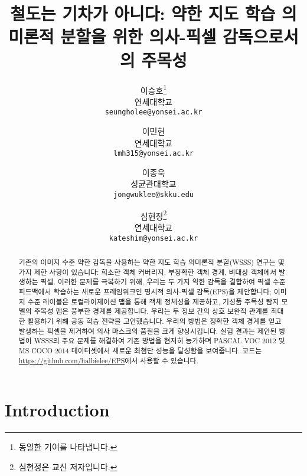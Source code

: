 \documentclass[final]{cvpr}
\begin{document}
\title{철도는 기차가 아니다: 약한 지도 학습 의미론적 분할을 위한 의사-픽셀 감독으로서의 주목성}

\author{이승호\thanks{동일한 기여를 나타냅니다.}\\
연세대학교\\
{\tt\small seungholee@yonsei.ac.kr}
\and
이민현\footnotemark[1]\\
연세대학교\\
{\tt\small lmh315@yonsei.ac.kr}
\and 
이종욱\\
성균관대학교\\
{\tt\small jongwuklee@skku.edu}
\and 
심현정\thanks{심현정은 교신 저자입니다.}\\
연세대학교\\
{\tt\small kateshim@yonsei.ac.kr}
}

\maketitle
\thispagestyle{empty}
\pagestyle{empty}


\begin{abstract}
기존의 이미지 수준 약한 감독을 사용하는 약한 지도 학습 의미론적 분할(WSSS) 연구는 몇 가지 제한 사항이 있습니다: 희소한 객체 커버리지, 부정확한 객체 경계, 비대상 객체에서 발생하는 픽셀. 이러한 문제를 극복하기 위해, 우리는 두 가지 약한 감독을 결합하여 픽셀 수준 피드백에서 학습하는 새로운 프레임워크인 명시적 의사-픽셀 감독(EPS)을 제안합니다; 이미지 수준 레이블은 로컬라이제이션 맵을 통해 객체 정체성을 제공하고, 기성품 주목성 탐지 모델의 주목성 맵은 풍부한 경계를 제공합니다. 우리는 두 정보 간의 상호 보완적 관계를 최대한 활용하기 위해 공동 학습 전략을 고안했습니다. 우리의 방법은 정확한 객체 경계를 얻고 발생하는 픽셀을 제거하여 의사 마스크의 품질을 크게 향상시킵니다. 실험 결과는 제안된 방법이 WSSS의 주요 문제를 해결하여 기존 방법을 현저히 능가하며 PASCAL VOC 2012 및 MS COCO 2014 데이터셋에서 새로운 최첨단 성능을 달성함을 보여줍니다. 코드는 \href{https://github.com/halbielee/EPS}{https://github.com/halbielee/EPS}에서 사용할 수 있습니다.
\end{abstract}


\section{Introduction}
\end{document}
